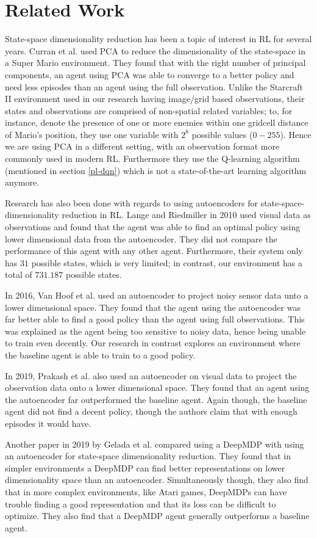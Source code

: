 \chapter{Related Work}\label{relatedwork}
State-space dimensionality reduction has been a topic of interest in RL for several years. Curran et al. \cite{mario} used PCA to reduce the dimensionality of the state-space in a Super Mario environment. They found that with the right number of principal components, an agent using PCA was able to converge to a better policy and need less episodes than an agent using the full observation. Unlike the Starcraft II environment used in our research having image/grid based observations, their states and observations are comprised of non-spatial related variables; to, for instance, denote the presence of one or more enemies within one gridcell distance of Mario's position, they use one variable with $2^8$ possible values ($0-255$). Hence we are using PCA in a different setting, with an observation format more commonly used in modern RL. Furthermore they use the Q-learning algorithm (mentioned in section \ref{pl-dqn}) which is not a state-of-the-art learning algorithm anymore.

Research has also been done with regards to using autoencoders for state-space-dimensionality reduction in RL. Lange and Riedmiller in 2010 \cite{AE_2010} used visual data as observations and found that the agent was able to find an optimal policy using lower dimensional data from the autoencoder. They did not compare the performance of this agent with any other agent. Furthermore, their system only has $31$ possible states, which is very limited; in contrast, our environment has a total of $731.187$ possible states. 

In 2016, Van Hoof et al. \cite{AE_2016} used an autoencoder to project noisy sensor data unto a lower dimensional space. They found that the agent using the autoencoder was far better able to find a good policy than the agent using full observations. This was explained as the agent being too sensitive to noisy data, hence being unable to train even decently. Our research in contrast explores an environment where the baseline agent is able to train to a good policy.

In 2019, Prakash et al. \cite{AE_2019} also used an autoencoder on visual data to project the observation data onto a lower dimensional space. They found that an agent using the autoencoder far outperformed the baseline agent. Again though, the baseline agent did not find a decent policy, though the authors claim that with enough episodes it would have.

Another paper in 2019 by Gelada et al. \cite{deepmdp} compared using a DeepMDP with using an autoencoder for state-space dimensionality reduction. They found that in simpler environments a DeepMDP can find better representations on lower dimensionality space than an autoencoder. Simultaneously though, they also find that in more complex environments, like Atari games, DeepMDPs can have trouble finding a good representation and that its loss can be difficult to optimize. They also find that a DeepMDP agent generally outperforms a baseline agent. 

